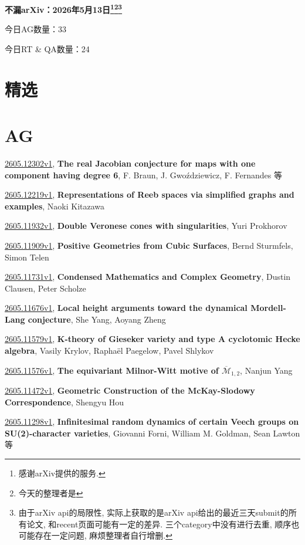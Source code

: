 \documentclass[9pt, a4paper]{article}
\theoremstyle{plain}
\theoremstyle{definition}
\theoremstyle{remark}
\newcommand{\arxiv}[3]{\href{https://arxiv.org/abs/#1}{#1}, \textbf{\textcolor{arxivblue}{#2}}, #3}
\newcommand{\AGnumber}{33}
\newcommand{\RTQAnumber}{24}
\newcommand{\NewestDate}{2026年5月13日}
\newcommand{\todayarXiver}{} %
\begin{document}
\begin{center}
    \Huge\textbf{不漏arXiv：\NewestDate\footnote{感谢arXiv提供的服务.}\footnote{今天的整理者是\todayarXiver}\footnote{由于arXiv api的局限性, 实际上获取的是arXiv api给出的最近三天submit的所有论文, 和recent页面可能有一定的差异. 三个category中没有进行去重, 顺序也可能存在一定问题, 麻烦整理者自行增删.}} \\
\end{center}

\setcounter{section}{-1}

\begin{center}
    今日AG数量：\AGnumber
    
    今日RT \& QA数量：\RTQAnumber
    
\end{center}


\section{精选}


\section{AG}
\arxiv{2605.12302v1}{The real Jacobian conjecture for maps with one component having degree 6}{F. Braun, J. Gwoździewicz, F. Fernandes 等}

\arxiv{2605.12219v1}{Representations of Reeb spaces via simplified graphs and examples}{Naoki Kitazawa}

\arxiv{2605.11932v1}{Double Veronese cones with singularities}{Yuri Prokhorov}

\arxiv{2605.11909v1}{Positive Geometries from Cubic Surfaces}{Bernd Sturmfels, Simon Telen}

\arxiv{2605.11731v1}{Condensed Mathematics and Complex Geometry}{Dustin Clausen, Peter Scholze}

\arxiv{2605.11676v1}{Local height arguments toward the dynamical Mordell-Lang conjecture}{She Yang, Aoyang Zheng}

\arxiv{2605.11579v1}{K-theory of Gieseker variety and type A cyclotomic Hecke algebra}{Vasily Krylov, Raphaël Paegelow, Pavel Shlykov}

\arxiv{2605.11576v1}{The equivariant Milnor-Witt motive of $\overline{\mathcal{M}}_{1,2}$}{Nanjun Yang}

\arxiv{2605.11472v1}{Geometric Construction of the McKay-Slodowy Correspondence}{Shengyu Hou}

\arxiv{2605.11298v1}{Infinitesimal random dynamics of certain Veech groups on SU(2)-character varieties}{Giovanni Forni, William M. Goldman, Sean Lawton 等}
\end{document}
